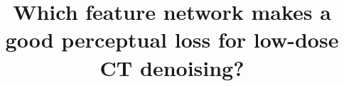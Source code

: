 \documentclass{article}
\title{Which feature network makes a good perceptual loss for low-dose CT denoising?}
\begin{document}
\ninept  %
\maketitle









\small  %

\end{document}
